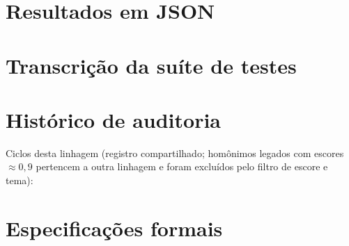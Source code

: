 \chapter{Resultados em JSON}
\label{ap:json}






\chapter{Transcrição da suíte de testes}
\label{ap:testes}



\chapter{Histórico de auditoria}
\label{ap:historico}
Ciclos desta linhagem (registro compartilhado; homônimos legados com escores $\approx0{,}9$ pertencem a outra linhagem e foram excluídos pelo filtro de escore e tema):
\begin{table}[h]
\centering
\caption{Ciclos de evolução da linhagem Lean-roteamento.}

\end{table}
\chapter{Especificações formais}
\label{ap:specs}




